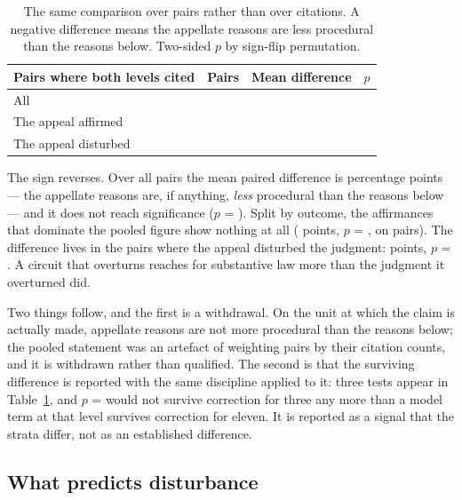 \documentclass[11pt]{article}
\begin{document}
\begin{table}[t]
\centering
\caption{The same comparison over pairs rather than over citations. A negative
difference means the appellate reasons are less procedural than the reasons
below. Two-sided $p$ by sign-flip permutation.}
\label{tab:paired}
\begin{tabular}{lrrr}
\toprule
Pairs where both levels cited & Pairs & Mean difference & $p$ \\
\midrule
All                      & \nPairsTested{}    & \nDiffAll{}       & \nPDiffAll{} \\
The appeal affirmed      & \nPairsAffirmed{}  & \nDiffAffirmed{}  & \nPDiffAffirmed{} \\
The appeal disturbed     & \nPairsDisturbed{} & \nDiffDisturbed{} & \nPDiffDisturbed{} \\
\bottomrule
\end{tabular}
\end{table}

The sign reverses. Over all pairs the mean paired difference is
\nDiffAll{} percentage points --- the appellate reasons are, if anything,
\emph{less} procedural than the reasons below --- and it does not reach
significance ($p$ = \nPDiffAll{}). Split by outcome, the affirmances that
dominate the pooled figure show nothing at all (\nDiffAffirmed{} points, $p$ =
\nPDiffAffirmed{}, on \nPairsAffirmed{} pairs). The difference lives in the
\nPairsDisturbed{} pairs where the appeal disturbed the judgment:
\nDiffDisturbed{} points, $p$ = \nPDiffDisturbed{}. A circuit that overturns
reaches for substantive law more than the judgment it overturned did.

Two things follow, and the first is a withdrawal. On the unit at which the
claim is actually made, appellate reasons are not more procedural than the
reasons below; the pooled statement was an artefact of weighting pairs by
their citation counts, and it is withdrawn rather than qualified. The second
is that the surviving difference is reported with the same discipline applied
to it: three tests appear in Table~\ref{tab:paired}, and $p$ =
\nPDiffDisturbed{} would not survive correction for three any more than a
model term at that level survives correction for eleven. It is reported as a
signal that the strata differ, not as an established difference.

\subsection{What predicts disturbance}
\end{document}
